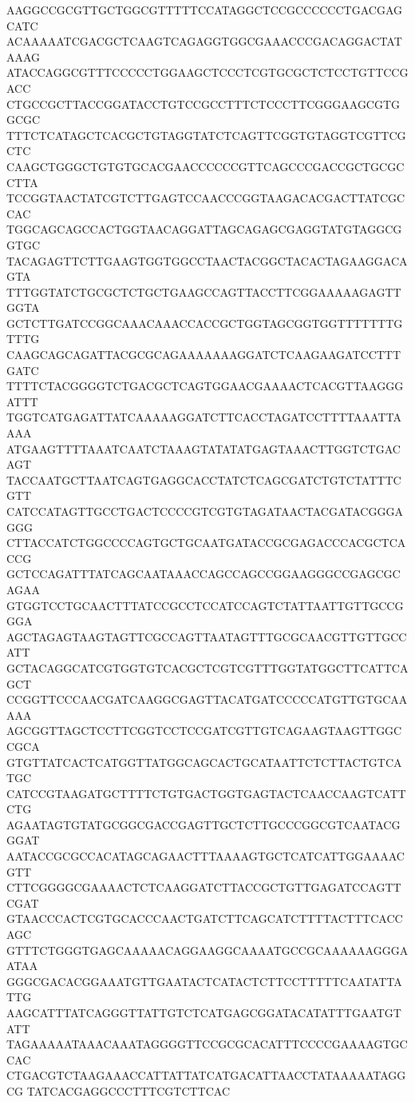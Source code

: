 {AAGGCCGCGTTGCTGGCGTTTTTCCATAGGCTCCGCCCCCCTGACGAGCATC
ACAAAAATCGACGCTCAAGTCAGAGGTGGCGAAACCCGACAGGACTATAAAG
ATACCAGGCGTTTCCCCCTGGAAGCTCCCTCGTGCGCTCTCCTGTTCCGACC
CTGCCGCTTACCGGATACCTGTCCGCCTTTCTCCCTTCGGGAAGCGTGGCGC
TTTCTCATAGCTCACGCTGTAGGTATCTCAGTTCGGTGTAGGTCGTTCGCTC
CAAGCTGGGCTGTGTGCACGAACCCCCCGTTCAGCCCGACCGCTGCGCCTTA
TCCGGTAACTATCGTCTTGAGTCCAACCCGGTAAGACACGACTTATCGCCAC
TGGCAGCAGCCACTGGTAACAGGATTAGCAGAGCGAGGTATGTAGGCGGTGC
TACAGAGTTCTTGAAGTGGTGGCCTAACTACGGCTACACTAGAAGGACAGTA
TTTGGTATCTGCGCTCTGCTGAAGCCAGTTACCTTCGGAAAAAGAGTTGGTA
GCTCTTGATCCGGCAAACAAACCACCGCTGGTAGCGGTGGTTTTTTTGTTTG
CAAGCAGCAGATTACGCGCAGAAAAAAAGGATCTCAAGAAGATCCTTTGATC
TTTTCTACGGGGTCTGACGCTCAGTGGAACGAAAACTCACGTTAAGGGATTT
TGGTCATGAGATTATCAAAAAGGATCTTCACCTAGATCCTTTTAAATTAAAA
ATGAAGTTTTAAATCAATCTAAAGTATATATGAGTAAACTTGGTCTGACAGT
TACCAATGCTTAATCAGTGAGGCACCTATCTCAGCGATCTGTCTATTTCGTT
CATCCATAGTTGCCTGACTCCCCGTCGTGTAGATAACTACGATACGGGAGGG
CTTACCATCTGGCCCCAGTGCTGCAATGATACCGCGAGACCCACGCTCACCG
GCTCCAGATTTATCAGCAATAAACCAGCCAGCCGGAAGGGCCGAGCGCAGAA
GTGGTCCTGCAACTTTATCCGCCTCCATCCAGTCTATTAATTGTTGCCGGGA
AGCTAGAGTAAGTAGTTCGCCAGTTAATAGTTTGCGCAACGTTGTTGCCATT
GCTACAGGCATCGTGGTGTCACGCTCGTCGTTTGGTATGGCTTCATTCAGCT
CCGGTTCCCAACGATCAAGGCGAGTTACATGATCCCCCATGTTGTGCAAAAA
AGCGGTTAGCTCCTTCGGTCCTCCGATCGTTGTCAGAAGTAAGTTGGCCGCA
GTGTTATCACTCATGGTTATGGCAGCACTGCATAATTCTCTTACTGTCATGC
CATCCGTAAGATGCTTTTCTGTGACTGGTGAGTACTCAACCAAGTCATTCTG
AGAATAGTGTATGCGGCGACCGAGTTGCTCTTGCCCGGCGTCAATACGGGAT
AATACCGCGCCACATAGCAGAACTTTAAAAGTGCTCATCATTGGAAAACGTT
CTTCGGGGCGAAAACTCTCAAGGATCTTACCGCTGTTGAGATCCAGTTCGAT
GTAACCCACTCGTGCACCCAACTGATCTTCAGCATCTTTTACTTTCACCAGC
GTTTCTGGGTGAGCAAAAACAGGAAGGCAAAATGCCGCAAAAAAGGGAATAA
GGGCGACACGGAAATGTTGAATACTCATACTCTTCCTTTTTCAATATTATTG
AAGCATTTATCAGGGTTATTGTCTCATGAGCGGATACATATTTGAATGTATT
TAGAAAAATAAACAAATAGGGGTTCCGCGCACATTTCCCCGAAAAGTGCCAC
CTGACGTCTAAGAAACCATTATTATCATGACATTAACCTATAAAAATAGGCG
TATCACGAGGCCCTTTCGTCTTCAC}


